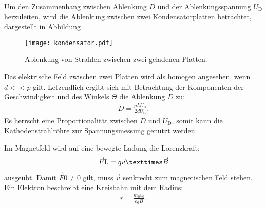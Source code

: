 Um den Zusammenhang zwischen Ablenkung $D$ und der Ablenkungsspannung
$U_\mathrm{D}$ herzuleiten, wird die Ablenkung zwischen zwei
Kondensatorplatten betrachtet, dargestellt in Abbildung \label{fig:platte}.
\begin{figure}
 \centering
 \texttt{[image: kondensator.pdf]}
 \caption{Ablenkung von Strahlen zwischen zwei geladenen Platten.}
 \label{fig:kondensator}
\end{figure}
Das elektrische Feld zwischen zwei Platten wird als homogen angesehen, wenn
$d<<p$ gilt.
Letzendlich ergibt sich mit Betrachtung der Komponenten der Geschwindigkeit
und des Winkels $\Theta$ die Ablenkung $D$ zu:
\begin{align}
 D=\frac{pLU_\mathrm{D}}{2dU_\mathrm{B}}.
\end{align}
Es herrscht eine Proportionalität zwischen $D$ und $U_\mathrm{D}$,
somit kann die Kathodenstrahlröhre zur Spannungsmessung genutzt werden.

Im Magnetfeld wird auf eine bewegte Ladung die Lorenzkraft:
\begin{align}
\vec{F}\mathrm{L}=q\vec{v}\texttimes\vec{B}
\end{align}
ausgeübt. Damit $\vec{F}\mathrm{0} \neq 0 $ gilt, muss $\vec{v}$ senkrecht zum magnetischen Feld stehen.
Ein Elektron beschreibt eine Kreisbahn mit dem Radius:
\begin{align}
r=\frac{m_0v_0}{e_0B}.
\end{align}
